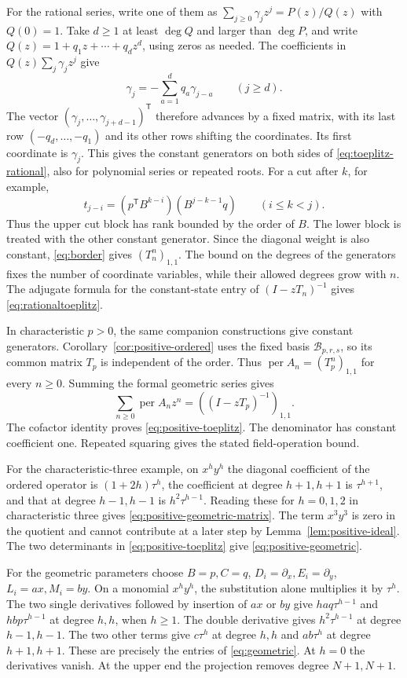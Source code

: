 \documentclass[11pt,reqno]{amsart}
\theoremstyle{remark}
\numberwithin{equation}{section}
\newcommand{\per}{\operatorname{per}}
\begin{document}
For the rational series, write one of them as \(\sum_{j\ge0}\gamma_j
z^j=P(z)/Q(z)\) with \(Q(0)=1\). Take \(d\ge1\) at least \(\deg Q\) and
larger than \(\deg P\), and write \(Q(z)=1+q_1z+\cdots+q_dz^d\), using
zeros as needed. The coefficients in \(Q(z)\sum_j\gamma_jz^j\) give
\[
 \gamma_j=-\sum_{a=1}^d q_a\gamma_{j-a}
 \qquad (j\ge d).
\]
The vector \((\gamma_j,\ldots,\gamma_{j+d-1})^{\mathsf T}\) therefore
advances by a fixed matrix, with its last row \((-q_d,\ldots,-q_1)\) and
its other rows shifting the coordinates. Its first coordinate is
\(\gamma_j\). This gives the constant generators on both sides of
\eqref{eq:toeplitz-rational}, also for polynomial series or repeated
roots. For a cut after \(k\), for example,
\[
 t_{j-i}=(p^{\mathsf T}B^{k-i})
                 (B^{j-k-1}q)\qquad (i\le k<j).
\]
Thus the upper cut block has rank bounded by the order of \(B\). The
lower block is treated with the other constant generator. Since the
diagonal weight is also constant, \eqref{eq:border} gives
\((T_n^n)_{1,1}\). The bound on the degrees of the generators
fixes the number of coordinate variables, while their allowed
degrees grow with \(n\). The adjugate formula for the
constant-state entry of \((I-zT_n)^{-1}\) gives \eqref{eq:rationaltoeplitz}.

In characteristic \(p>0\), the same companion constructions give
constant generators. Corollary~\ref{cor:positive-ordered} uses the
fixed basis \(\mathcal B_{p,r,s}\), so its common matrix \(T_p\)
is independent of the order. Thus \(\per A_n=(T_p^n)_{1,1}\) for
every \(n\geq0\). Summing the formal geometric series gives
\[
 \sum_{n\geq0}\per A_n z^n=((I-zT_p)^{-1})_{1,1}.
\]
The cofactor identity proves \eqref{eq:positive-toeplitz}. The
denominator has constant coefficient one. Repeated squaring gives
the stated field-operation bound.

For the characteristic-three example, on \(x^hy^h\) the diagonal
coefficient of the ordered operator is \((1+2h)\tau^h\), the
coefficient at degree \(h+1,h+1\) is \(\tau^{h+1}\), and that
at degree \(h-1,h-1\) is \(h^2\tau^{h-1}\). Reading these for
\(h=0,1,2\) in characteristic three gives
\eqref{eq:positive-geometric-matrix}. The term \(x^3y^3\) is
zero in the quotient and cannot contribute at a later step by
Lemma~\ref{lem:positive-ideal}. The two determinants in
\eqref{eq:positive-toeplitz} give \eqref{eq:positive-geometric}.

For the geometric parameters choose \(B=p,C=q\),
\(D_i=\partial_x,E_i=\partial_y\), \(L_i=ax,M_i=by\). On a monomial
\(x^hy^h\), the substitution alone multiplies it by \(\tau^h\). The two
single derivatives followed by insertion of \(ax\) or \(by\) give
\(haq\tau^{h-1}\) and \(hbp\tau^{h-1}\) at degree \(h,h\), when
\(h\ge1\). The double derivative gives \(h^2\tau^{h-1}\) at degree
\(h-1,h-1\). The two other terms give \(c\tau^h\) at degree \(h,h\) and
\(ab\tau^h\) at degree \(h+1,h+1\). These are precisely the entries of
\eqref{eq:geometric}. At \(h=0\) the derivatives vanish. At the upper end
the projection removes degree \(N+1,N+1\).
\end{document}
